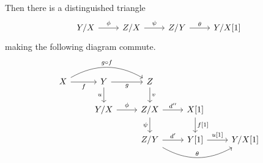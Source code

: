\documentclass[main.tex]{subfiles}
\begin{document}
\begin{definition}
\begin{enumerate}[label=(TR\arabic*), leftmargin=*]
      Then there is a distinguished triangle
      \begin{equation*}
        \begin{tikzcd}
          Y/X
          \arrow[r, "\phi"]
          & Z/X
          \arrow[r, "\psi"]
          & Z/Y
          \arrow[r, "\theta"]
          & Y/X[1]
        \end{tikzcd}
      \end{equation*}
      making the following diagram commute.
      \begin{equation*}
        \begin{tikzcd}
          X
          \arrow[r, swap, "f"]
          \arrow[rr, bend left, "g \circ f"]
          & Y
          \arrow[r, swap, "g"]
          \arrow[d, swap, "u"]
          & Z
          \arrow[d, "v"]
          \\
          & Y/X
          \arrow[r, "\phi"]
          & Z/X
          \arrow[r, "d''"]
          \arrow[d, swap, "\psi"]
          & X[1]
          \arrow[d, "{f[1]}"]
          \\
          && Z/Y
          \arrow[r, "d'"]
          \arrow[rr, bend right, "\theta"]
          & Y[1]
          \arrow[r, "{u[1]}"]
          & Y/X[1]
        \end{tikzcd}
      \end{equation*}
  \end{enumerate}

\end{definition}
\end{document}
